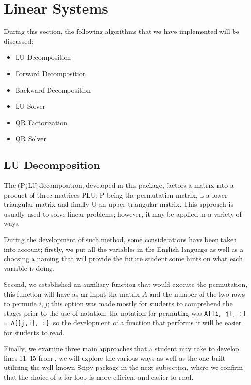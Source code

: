 \section{Linear Systems}
During this section, the following algorithms that we have implemented will be discussed:
\begin{itemize}
    \item LU Decomposition  
    \item Forward Decomposition 
    \item Backward Decomposition 
    \item LU Solver 
    \item QR Factorization 
    \item QR Solver 
\end{itemize}

\subsection{LU Decomposition}
The (P)LU decomposition, developed in this package, factors a matrix into a product of three matrices PLU, P being the permutation matrix, L a lower triangular matrix and finally U an upper triangular matrix. This approach is usually used to solve linear problems; however, it may be applied in a variety of ways.

During the development of such method, some considerations have been taken into account; firstly, we put all the variables in the English language as well as a choosing a naming that will provide the future student some hints on what each variable is doing. 

Second, we established an auxiliary function that would execute the permutation, this function will have as an input the matrix $A$ and the number of the two rows to permute $i,j$; this option was made mostly for students to comprehend the stages prior to the use of notation; the notation for permuting was \lstinline|A[[i, j], :] = A[[j,i], :]|, so the development of a function that performs it will be easier for students to read.

Finally, we examine three main approaches that a student may take to develop lines 11–15 from , we will explore the various ways as well as the one built utilizing the well-known Scipy package in the next subsection, where we confirm that the choice of a for-loop is more efficient and easier to read.

